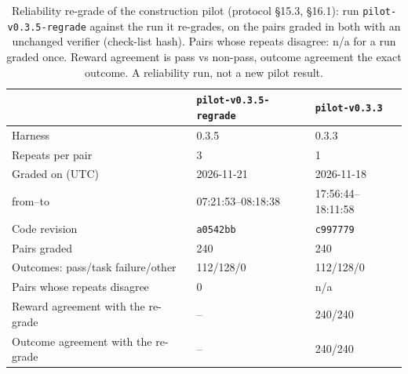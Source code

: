 \begin{table}[t]\centering\footnotesize
\caption{Reliability re-grade of the construction pilot (protocol \S15.3, \S16.1): run \texttt{pilot-v0.3.5-regrade} against the run it re-grades, on the pairs graded in both with an unchanged verifier (check-list hash). Pairs whose repeats disagree: n/a for a run graded once. Reward agreement is pass vs non-pass, outcome agreement the exact outcome. A reliability run, not a new pilot result.}\label{tab:regrade}
\begin{tabular}{lll}\toprule  & \texttt{pilot-v0.3.5-regrade} & \texttt{pilot-v0.3.3} \\\midrule
Harness & 0.3.5 & 0.3.3 \\
Repeats per pair & 3 & 1 \\
Graded on (UTC) & 2026-11-21 & 2026-11-18 \\
\quad from--to & 07:21:53--08:18:38 & 17:56:44--18:11:58 \\
Code revision & \texttt{a0542bb} & \texttt{c997779} \\
Pairs graded & 240 & 240 \\
Outcomes: pass/task failure/other & 112/128/0 & 112/128/0 \\
Pairs whose repeats disagree & 0 & n/a \\
Reward agreement with the re-grade & -- & 240/240 \\
Outcome agreement with the re-grade & -- & 240/240 \\
\bottomrule\end{tabular}\end{table}
